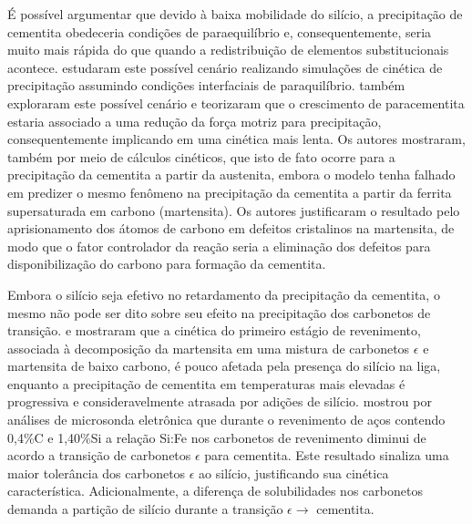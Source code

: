 É possível argumentar que devido à baixa mobilidade do silício, a precipitação de cementita obedeceria condições de paraequilíbrio e, consequentemente, seria muito mais rápida do que quando a redistribuição de elementos substitucionais acontece.
 estudaram este possível cenário realizando simulações de cinética de precipitação assumindo condições interfaciais de paraquilíbrio.  também exploraram este possível cenário e teorizaram que o crescimento de paracementita estaria associado a uma redução da força motriz para precipitação, consequentemente implicando em uma cinética mais lenta. Os autores mostraram, também por meio de cálculos cinéticos, que isto de fato ocorre para a precipitação da cementita a partir da austenita, embora o modelo tenha falhado em predizer o mesmo fenômeno na precipitação da cementita a partir da ferrita supersaturada em carbono (martensita). Os autores justificaram o resultado pelo aprisionamento dos átomos de carbono em defeitos cristalinos na martensita, de modo que o fator controlador da reação seria a eliminação dos defeitos para disponibilização do carbono para formação da cementita.


Embora o silício seja efetivo no retardamento da precipitação da cementita, o mesmo não pode ser dito sobre seu efeito na precipitação dos carbonetos de transição.  e  mostraram que a cinética do primeiro estágio de revenimento, associada à decomposição da martensita em uma mistura de carbonetos $\epsilon$ e martensita de baixo carbono, é pouco afetada pela presença do silício na liga, enquanto a precipitação de cementita em temperaturas mais elevadas é progressiva e consideravelmente atrasada por adições de silício.  mostrou por análises de microsonda eletrônica que durante o revenimento de aços contendo 0,4\%C e 1,40\%Si a relação Si:Fe nos carbonetos de revenimento diminui de acordo a transição de carbonetos $\epsilon$ para cementita. Este resultado sinaliza uma maior tolerância dos carbonetos $\epsilon$ ao silício, justificando sua cinética característica. Adicionalmente, a diferença de solubilidades nos carbonetos demanda a partição de silício durante a transição $\epsilon \rightarrow$ cementita.

